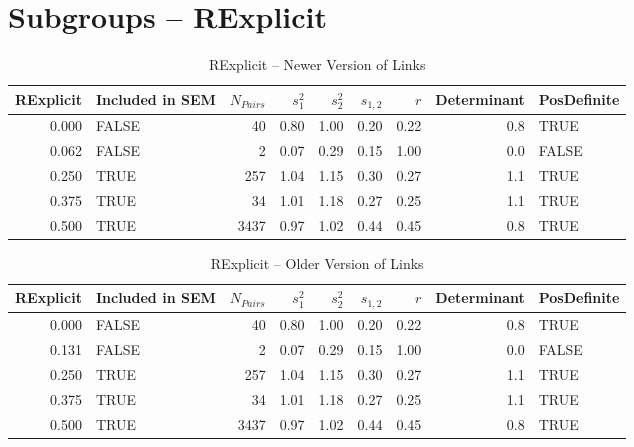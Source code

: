 \documentclass{article}\usepackage{graphicx, color}
\begin{document}
\section{Subgroups --  RExplicit }%
\begin{table}[ht]
\centering
\begin{tabular}{rlrrrrrrl}
  \hline
RExplicit & Included in SEM & $N_{Pairs}$ & $s_1^2$ & $s_2^2$ & $s_{1,2}$ & $r$ & Determinant & PosDefinite \\ 
  \hline
0.000 & FALSE & 40 & 0.80 & 1.00 & 0.20 & 0.22 & 0.8 & TRUE \\ 
  0.062 & FALSE & 2 & 0.07 & 0.29 & 0.15 & 1.00 & 0.0 & FALSE \\ 
  0.250 & TRUE & 257 & 1.04 & 1.15 & 0.30 & 0.27 & 1.1 & TRUE \\ 
  0.375 & TRUE & 34 & 1.01 & 1.18 & 0.27 & 0.25 & 1.1 & TRUE \\ 
  0.500 & TRUE & 3437 & 0.97 & 1.02 & 0.44 & 0.45 & 0.8 & TRUE \\ 
   \hline
\end{tabular}
\caption{RExplicit -- Newer Version of Links} 
\end{table}
\begin{table}[ht]
\centering
\begin{tabular}{rlrrrrrrl}
  \hline
RExplicit & Included in SEM & $N_{Pairs}$ & $s_1^2$ & $s_2^2$ & $s_{1,2}$ & $r$ & Determinant & PosDefinite \\ 
  \hline
0.000 & FALSE & 40 & 0.80 & 1.00 & 0.20 & 0.22 & 0.8 & TRUE \\ 
  0.131 & FALSE & 2 & 0.07 & 0.29 & 0.15 & 1.00 & 0.0 & FALSE \\ 
  0.250 & TRUE & 257 & 1.04 & 1.15 & 0.30 & 0.27 & 1.1 & TRUE \\ 
  0.375 & TRUE & 34 & 1.01 & 1.18 & 0.27 & 0.25 & 1.1 & TRUE \\ 
  0.500 & TRUE & 3437 & 0.97 & 1.02 & 0.44 & 0.45 & 0.8 & TRUE \\ 
   \hline
\end{tabular}
\caption{RExplicit -- Older Version of Links} 
\end{table}
\newpage 
\end{document}
